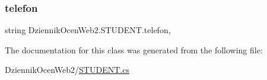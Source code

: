 \subsubsection{\texorpdfstring{telefon}{telefon}}
{\footnotesize\ttfamily string Dziennik\+Ocen\+Web2.\+S\+T\+U\+D\+E\+N\+T.\+telefon\hspace{0.3cm}{\ttfamily [get]}, {\ttfamily [set]}}



The documentation for this class was generated from the following file\+:\begin{DoxyCompactItemize}
\item 
Dziennik\+Ocen\+Web2/\hyperlink{_s_t_u_d_e_n_t_8cs}{S\+T\+U\+D\+E\+N\+T.\+cs}\end{DoxyCompactItemize}
